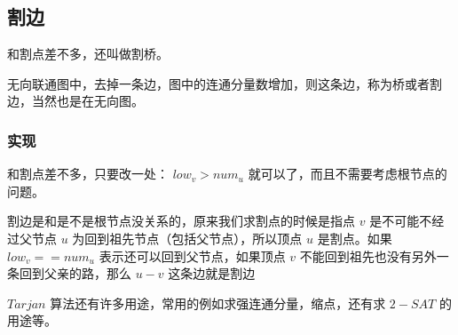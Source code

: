 \subsection{割边}

和割点差不多，还叫做割桥。

\begin{QUOTE}{}{}
无向联通图中，去掉一条边，图中的连通分量数增加，则这条边，称为桥或者割边，当然也是在无向图。
\end{QUOTE}

\subsubsection{实现}

和割点差不多，只要改一处： $low_v>num_u$ 就可以了，而且不需要考虑根节点的问题。

割边是和是不是根节点没关系的，原来我们求割点的时候是指点 $v$ 是不可能不经过父节点 $u$ 为回到祖先节点（包括父节点），所以顶点 $u$ 是割点。如果 $low_v==num_u$ 表示还可以回到父节点，如果顶点 $v$ 不能回到祖先也没有另外一条回到父亲的路，那么 $u-v$ 这条边就是割边

$Tarjan$ 算法还有许多用途，常用的例如求强连通分量，缩点，还有求 $2-SAT$ 的用途等。
